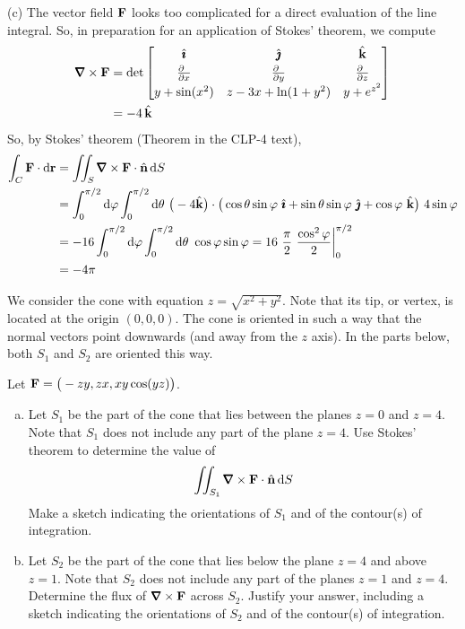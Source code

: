 \begin{solution}
(c) The vector field $\mathbf{F}$ looks too complicated for a direct evaluation
of the line integral. So, in preparation for an application of Stokes'
theorem, we compute
\begin{align*}
\vnabla\times\vF&=\det\left[\begin{matrix}\hi&\hj&\hk\\[0.03in] 
     \frac{\partial\hfill}{\partial x}&
        \frac{\partial\hfill}{\partial y}&
        \frac{\partial\hfill}{\partial z}\\[0.03in]
 y + \sin(x^2) & z - 3x + \ln(1 + y^2) & y + e^{z^2}\end{matrix}\right] \\
&= -4\,\hk
\end{align*}
So, by Stokes' theorem (Theorem  in the CLP-4 text), 
\begin{align*}
\int_C\vF\cdot\dee{\vr}
&=\dblInt_S\vnabla\times\vF\cdot\hn\,\dee{S} \\
&= \int_0^{\pi/2}\dee{\varphi}\int_0^{\pi/2}\dee{\theta}\ 
\big(-4\hk\big)\cdot
\big(\cos\theta\sin\varphi\ \hi
            +\sin\theta\sin\varphi\ \hj
            +\cos\varphi\ \hk\big)\ 
          4\sin\varphi \\
&=-16 \int_0^{\pi/2}\dee{\varphi}\int_0^{\pi/2}\dee{\theta}\ 
              \cos\varphi\sin\varphi 
=16\ \frac{\pi}{2}\ \frac{\cos^2\varphi}{2}\bigg|_0^{\pi/2}\\
&=-4\pi
\end{align*}
\end{solution}


\begin{question}[M317 2016A] %
We consider the cone with equation $z = \sqrt{x^2 + y^2}$. Note that its tip, 
or vertex, is located at the origin $(0, 0, 0)$. The cone is oriented 
in such a way that the normal vectors point downwards (and away from 
the $z$ axis). In the parts below, both $S_1$ and $S_2$ are 
oriented this way.

Let $\mathbf{F} = \big(-zy, zx, xy \cos(yz)\big)$.

\begin{enumerate}[(a)]
\item
Let $S_1$ be the part of the cone that lies between the planes 
$z = 0$ and $z = 4$. Note that $S_1$ does not include any part of 
the plane $z = 4$. Use Stokes' theorem to determine the value of
\begin{equation*}
\dblInt_{S_1} \vnabla\times\vF \cdot \hn\,\dee{S}
\end{equation*}
Make a sketch indicating the orientations of $S_1$ and of the 
contour(s) of integration.

\item
Let $S_2$ be the part of the cone that lies below the plane 
$z = 4$ and above $z = 1$. Note that $S_2$ does not include any part 
of the planes $z = 1$ and $z = 4$. Determine the flux of $\vnabla\times\vF$ across $S_2$. Justify your answer, including a sketch indicating the
orientations of $S_2$ and of the contour(s) of integration.
\end{enumerate}
\end{question}

